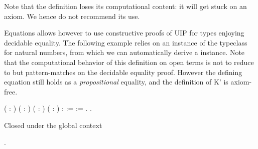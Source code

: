 Note that the definition loses its computational content: it will
      get stuck on an axiom. We hence do not recommend its use.


      Equations allows however to use constructive proofs of UIP for types
      enjoying decidable equality. The following example relies on an
      instance of the  typeclass for natural numbers, from which
      we can automatically derive a   instance.  Note that
      the computational behavior of this definition on open terms is not
      to reduce to  but pattern-matches on the decidable equality
      proof.  However the defining equation still holds as a
      \textit{propositional} equality, and the definition of K' is axiom-free. \begin{coqdoccode}
\coqdocemptyline
\coqdocindent{1.00em}
  ( : ) ( :     ) ( :  )\coqdoceol
\coqdocindent{6.00em}
( :   ) :   :=\coqdoceol
\coqdocindent{2.00em}
     := .\coqdoceol
\coqdocemptyline
\coqdocindent{1.00em}
  .\coqdoceol
\coqdocindent{1.00em}
\begin{coqdoccomment}
\coqdocindent{0.50em}
Closed\coqdocindent{0.50em}
under\coqdocindent{0.50em}
the\coqdocindent{0.50em}
global\coqdocindent{0.50em}
context\coqdocindent{0.50em}
\end{coqdoccomment}
\coqdoceol
\coqdocemptyline
\coqdocnoindent
{} .\coqdoceol
\end{coqdoccode}
